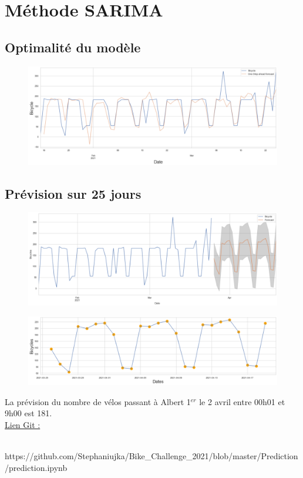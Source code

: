 \documentclass{article}
\begin{document}
\section{Méthode SARIMA}

\subsection{Optimalité du modèle}

\begin{figure}[h]
    \centering
    \includegraphics[scale=0.4]{data2.png}
\end{figure}

\subsection{Prévision sur 25 jours}

\begin{figure}[h]
    \centering
    \includegraphics[scale=0.4]{data3.png}
\end{figure}

\begin{figure}[h]
    \centering
    \includegraphics[scale=0.4]{data4.png}
\end{figure}

La prévision du nombre de vélos passant à Albert 1$^{er}$ le 2 avril entre 00h01 et 9h00 est 181.\\

\underline{Lien Git :}\\ \\ \par https://github.com/Stephaniujka/Bike\_Challenge\_2021/blob/master/Prediction/prediction.ipynb\\
\end{document}
